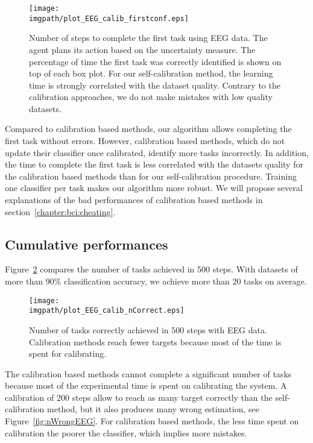 \begin{figure}[!htbp]
\centering
\texttt{[image: \\imgpath/plot\_EEG\_calib\_firstconf.eps]}
\caption{Number of steps to complete the first task using EEG data. The agent plans its action based on the uncertainty measure. The percentage of time the first task was correctly identified is shown on top of each box plot. For our self-calibration method, the learning time is strongly correlated with the dataset quality. Contrary to the calibration approaches, we do not make mistakes with low quality datasets.}
\label{fig:firstEEG}
\end{figure}

Compared to calibration based methods, our algorithm allows completing the first task without errors. However, calibration based methods, which do not update their classifier once calibrated, identify more tasks incorrectly. In addition, the time to complete the first task is less correlated with the datasets quality for the calibration based methods than for our self-calibration procedure. Training one classifier per task makes our algorithm more robust. We will propose several explanations of the bad performances of calibration based methods in section~\ref{chapter:bci:cheating}.

\subsection{Cumulative performances}

Figure~\ref{fig:nCorrectEEG} compares the number of tasks achieved in 500 steps. With datasets of more than 90\% classification accuracy, we achieve more than 20 tasks on average. 


\begin{figure}[!htbp]
\centering
\texttt{[image: \\imgpath/plot\_EEG\_calib\_nCorrect.eps]}
\caption{Number of tasks correctly achieved in 500 steps with EEG data. Calibration methods reach fewer targets because most of the time is spent for calibrating.}
\label{fig:nCorrectEEG}
\end{figure} 

\visuopti{\newpage}

The calibration based methods cannot complete a significant number of tasks because most of the experimental time is spent on calibrating the system. A calibration of 200 steps allow to reach as many target correctly than the self-calibration method, but it also produces many wrong estimation, see Figure~\ref{fig:nWrongEEG}. For calibration based methods, the less time spent on calibration the poorer the classifier, which implies more mistakes.

